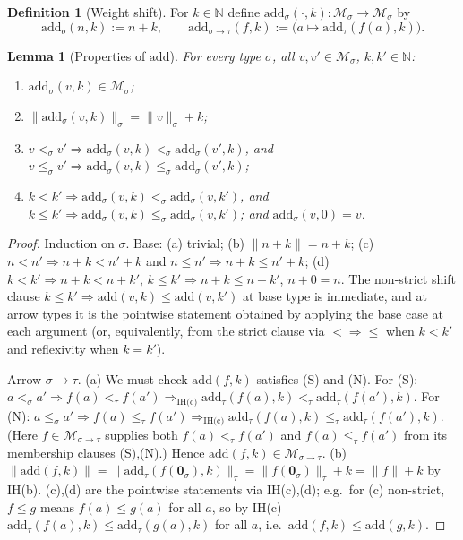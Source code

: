 \documentclass{amsart}
\newtheorem{lemma}{Lemma}
\theoremstyle{definition}
\newtheorem{definition}{Definition}
\begin{document}
\begin{definition}[Weight shift]\label{def:add}
For $k\in\mathbb N$ define $\mathrm{add}_\sigma(\cdot,k):\mathcal M_\sigma\to\mathcal M_\sigma$ by
\[
  \mathrm{add}_o(n,k):=n+k,\qquad
  \mathrm{add}_{\sigma\to\tau}(f,k):=\bigl(a\mapsto\mathrm{add}_\tau(f(a),k)\bigr).
\]
\end{definition}

\begin{lemma}[Properties of $\mathrm{add}$]\label{lem:add}
For every type $\sigma$, all $v,v'\in\mathcal M_\sigma$, $k,k'\in\mathbb N$:
\begin{enumerate}
\item[(a)] $\mathrm{add}_\sigma(v,k)\in\mathcal M_\sigma$;
\item[(b)] $\|\mathrm{add}_\sigma(v,k)\|_\sigma=\|v\|_\sigma+k$;
\item[(c)] $v<_\sigma v'\Rightarrow\mathrm{add}_\sigma(v,k)<_\sigma\mathrm{add}_\sigma(v',k)$,
  and $v\le_\sigma v'\Rightarrow\mathrm{add}_\sigma(v,k)\le_\sigma\mathrm{add}_\sigma(v',k)$;
\item[(d)] $k<k'\Rightarrow\mathrm{add}_\sigma(v,k)<_\sigma\mathrm{add}_\sigma(v,k')$,
  and $k\le k'\Rightarrow\mathrm{add}_\sigma(v,k)\le_\sigma\mathrm{add}_\sigma(v,k')$;
  and $\mathrm{add}_\sigma(v,0)=v$.
\end{enumerate}
\end{lemma}

\begin{proof}
Induction on $\sigma$. Base: (a) trivial; (b) $\|n+k\|=n+k$; (c) $n<n'\Rightarrow n+k<n'+k$
and $n\le n'\Rightarrow n+k\le n'+k$; (d) $k<k'\Rightarrow n+k<n+k'$, $k\le k'\Rightarrow
n+k\le n+k'$, $n+0=n$. The non-strict shift clause $k\le k'\Rightarrow\mathrm{add}(v,k)\le
\mathrm{add}(v,k')$ at base type is immediate, and at arrow types it is the pointwise
statement obtained by applying the base case at each argument (or, equivalently, from the
strict clause via $<\Rightarrow\le$ when $k<k'$ and reflexivity when $k=k'$).

Arrow $\sigma\to\tau$. (a) We must check $\mathrm{add}(f,k)$ satisfies (S) and (N). For (S):
$a<_\sigma a'\Rightarrow f(a)<_\tau f(a')\Rightarrow_{\text{IH(c)}}
\mathrm{add}_\tau(f(a),k)<_\tau\mathrm{add}_\tau(f(a'),k)$. For (N): $a\le_\sigma a'\Rightarrow
f(a)\le_\tau f(a')\Rightarrow_{\text{IH(c)}}\mathrm{add}_\tau(f(a),k)\le_\tau
\mathrm{add}_\tau(f(a'),k)$. (Here $f\in\mathcal M_{\sigma\to\tau}$ supplies both
$f(a)<_\tau f(a')$ and $f(a)\le_\tau f(a')$ from its membership clauses (S),(N).) Hence
$\mathrm{add}(f,k)\in\mathcal M_{\sigma\to\tau}$.
(b) $\|\mathrm{add}(f,k)\|=\|\mathrm{add}_\tau(f(\mathbf 0_\sigma),k)\|_\tau=
\|f(\mathbf 0_\sigma)\|_\tau+k=\|f\|+k$ by IH(b). (c),(d) are the pointwise statements via
IH(c),(d); e.g.\ for (c) non-strict, $f\le g$ means $f(a)\le g(a)$ for all $a$, so by IH(c)
$\mathrm{add}_\tau(f(a),k)\le\mathrm{add}_\tau(g(a),k)$ for all $a$, i.e.\
$\mathrm{add}(f,k)\le\mathrm{add}(g,k)$.
\end{proof}
\end{document}
